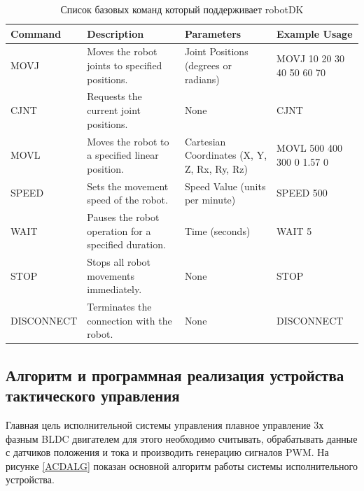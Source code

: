 \begin{table}[H]
	\caption{Список базовых команд который поддерживает robotDK}\label{TRobotDK}
	\begin{adjustbox}{width=\textwidth}

		\begin{tabular}{|l|l|l|l|}
			\hline
			Command    & Description                                             & Parameters                                     & Example 			Usage             \\ \hline
			MOVJ       & Moves 			the robot joints to specified positions.       & Joint 			Positions (degrees or radians)        & MOVJ 			10 20 30 40 50 60 70 \\ \hline
			CJNT       & Requests 			the current joint positions.                & None                                           & CJNT                         \\ \hline
			MOVL       & Moves 			the robot to a specified linear position.      & Cartesian 			Coordinates (X, Y, Z, Rx, Ry, Rz) & MOVL 			500 400 300 0 1.57 0 \\ \hline
			SPEED      & Sets 			the movement speed of the robot.                & Speed 			Value (units per minute)              & SPEED 			500                 \\ \hline
			WAIT       & Pauses 			the robot operation for a specified duration. & Time 			(seconds)                              & WAIT 			5                    \\ \hline
			STOP       & Stops 			all robot movements immediately.               & None                                           & STOP                         \\ \hline
			DISCONNECT & Terminates 			the connection with the robot.            & None                                           & DISCONNECT                   \\ \hline
		\end{tabular}
	\end{adjustbox}

\end{table}

\subsection{Алгоритм и программная реализация устройства тактического управления}

Главная цель исполнительной системы управления плавное управление 3х фазным BLDC двигателем для этого необходимо считывать, обрабатывать данные с датчиков положения и тока и производить генерацию сигналов PWM. На рисунке \ref{ACDALG} показан основной алгоритм работы системы исполнительного устройства.


